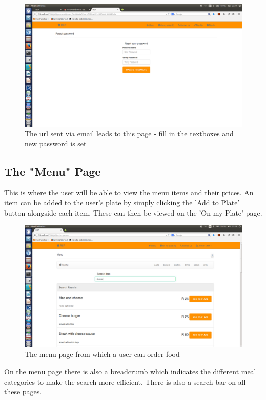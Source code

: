 \documentclass[a4paper,12pt]{article}
\begin{document}
\begin{figure}[H]
  \centering
    \includegraphics[width=1.0\textwidth]{screenshots/newPassForPass.png}
    \caption{The url sent via email leads to this page - fill in the textboxes and new password is set} 
\end{figure}

\subsection{The "Menu" Page} 
This is where the user will be able to view the menu items and their prices. An item can be added to the user's plate by simply clicking the 'Add to Plate' button alongside each item. These can then be viewed on the 'On my Plate' page.
\\
\begin{figure}[H]
  \centering
    \includegraphics[width=1.0\textwidth]{screenshots/searchCheese.png}
    \caption{The menu page from which a user can order food} 
\end{figure}
On the menu page there is also a breadcrumb which indicates the different meal categories to make the search more efficient. There is also a search bar on all these pages. 
\end{document}
